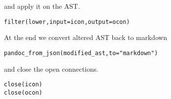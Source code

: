 \documentclass[a4paper]{article}\usepackage[]{graphicx}\usepackage[]{color}
\makeatletter
\newcommand{\hlstr}[1]{\textcolor[rgb]{0.741,0.553,0.545}{#1}}%
\newcommand{\hlstd}[1]{\textcolor[rgb]{0,0,0}{#1}}%
\newcommand{\hlkwc}[1]{\textcolor[rgb]{0,0,1}{#1}}%
\newcommand{\hlkwd}[1]{\textcolor[rgb]{0,0,0}{#1}}%
\newenvironment{kframe}{%
 \def\at@end@of@kframe{}%
 \ifinner\ifhmode%
  \def\at@end@of@kframe{\end{minipage}}%
  \begin{minipage}{\columnwidth}%
 \fi\fi%
 \def\FrameCommand##1{\hskip\@totalleftmargin \hskip-\fboxsep
 \colorbox{shadecolor}{##1}\hskip-\fboxsep
     \hskip-\linewidth \hskip-\@totalleftmargin \hskip\columnwidth}%
 \MakeFramed {\advance\hsize-\width
   \@totalleftmargin\z@ \linewidth\hsize
   \@setminipage}}%
 {\par\unskip\endMakeFramed%
 \at@end@of@kframe}
\newenvironment{knitrout}{}{} %
\makeatother
\begin{document}
and apply it on the AST.
\begin{knitrout}
\color{fgcolor}\begin{kframe}
\begin{alltt}
\hlkwd{filter}\hlstd{(lower,} \hlkwc{input} \hlstd{= icon,} \hlkwc{output} \hlstd{= ocon)}
\end{alltt}
\end{kframe}
\end{knitrout}

At the end we convert altered AST back to markdown
\begin{knitrout}
\color{fgcolor}\begin{kframe}
\begin{alltt}
\hlkwd{pandoc_from_json}\hlstd{(modified_ast,} \hlkwc{to} \hlstd{=}\hlstr{"markdown"}\hlstd{)}
\end{alltt}
\end{kframe}
\end{knitrout}

and close the open connections.
\begin{knitrout}
\color{fgcolor}\begin{kframe}
\begin{alltt}
\hlkwd{close}\hlstd{(icon)}
\hlkwd{close}\hlstd{(ocon)}
\end{alltt}
\end{kframe}
\end{knitrout}
\end{document}
